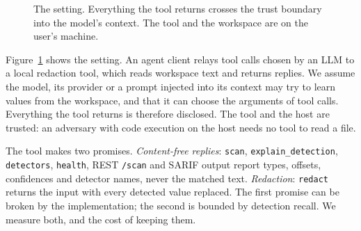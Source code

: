\documentclass[conference]{IEEEtran}
\begin{document}
\begin{figure}[t]
\centering
{}
\caption{The setting. Everything the tool returns crosses the trust boundary into the model's context. The tool and the workspace are on the user's machine.}\label{fig:topology}
\end{figure}

Figure~\ref{fig:topology} shows the setting. An agent client relays tool calls chosen by an LLM to a local redaction tool, which reads workspace text and returns replies. We assume the model, its provider or a prompt injected into its context \cite{greshake2023injection} may try to learn values from the workspace, and that it can choose the arguments of tool calls. Everything the tool returns is therefore disclosed. The tool and the host are trusted: an adversary with code execution on the host needs no tool to read a file.

The tool makes two promises. \emph{Content-free replies}: \texttt{scan}, \texttt{explain\_\allowbreak detection}, \texttt{detectors}, \texttt{health}, REST \texttt{/scan} and SARIF output report types, offsets, confidences and detector names, never the matched text. \emph{Redaction}: \texttt{redact} returns the input with every detected value replaced. The first promise can be broken by the implementation; the second is bounded by detection recall. We measure both, and the cost of keeping them.
\end{document}
